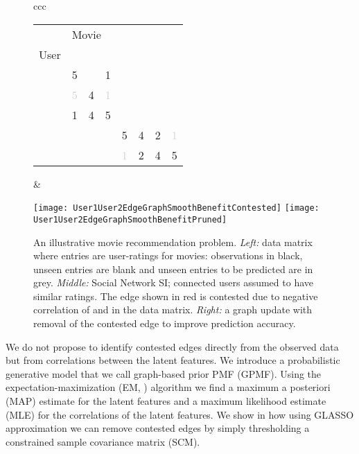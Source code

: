 \documentclass{article}
\theoremstyle{plain}
\theoremstyle{definition}
\theoremstyle{remark}
\begin{document}
\begin{figure}[t]
\begin{tabular}{ccc}
  \begin{minipage}[c]{0.6\textwidth}
  \vspace{0pt}
  \begin{tabular}{llllllll}
    \toprule
    \multicolumn{1}{c}{} & \multicolumn{3}{l}{Movie}                   \\
    \cmidrule(r){2-8}
     User     &  &  &  &  &  &  &  \\
    \midrule
      &  5 &   &  1   &&&&\\
          & \textcolor{lightgray}{5} &  4 & \textcolor{lightgray}{1} &&&&\\
       &  1 & 4 & 5  &&&& \\
      &&&&  5 & 4 & 2 &  \textcolor{lightgray}{1}   \\
     &&&& \textcolor{lightgray}{1} &  2 & 4 & 5 \\
    \bottomrule
  \end{tabular}
  \end{minipage}
  & 
  \begin{minipage}{0.35\textwidth}
  \flushleft
  {\vspace{0.01cm}\texttt{[image: User1User2EdgeGraphSmoothBenefitContested]}}
\flushright
   {\vspace{0.01cm}\texttt{[image: User1User2EdgeGraphSmoothBenefitPruned]}}
\end{minipage}
\end{tabular}
\caption{An illustrative movie recommendation problem.
\emph{Left:} data matrix where entries are user-ratings for movies: observations in black, unseen entries are blank and unseen entries to be predicted are in grey.
\emph{Middle:} Social Network SI; connected users assumed to have similar ratings. The edge shown in red is contested due to negative correlation of  and  in the data matrix. \emph{Right:} a graph update with removal of the contested edge to improve prediction accuracy.
}
\label{fig:CombinedIllustration}
\end{figure}



We do not propose to identify contested edges directly from the observed data but from correlations between the latent features. We introduce a probabilistic generative model that we call graph-based prior PMF (GPMF). Using the expectation-maximization (EM, \cite{bishop2006PRML}) algorithm we find a maximum a posteriori (MAP) estimate for the latent features and a maximum likelihood estimate (MLE) for the correlations of the latent features. We show in  how using GLASSO approximation we can remove contested edges by simply thresholding a constrained sample covariance matrix (SCM).
\end{document}
